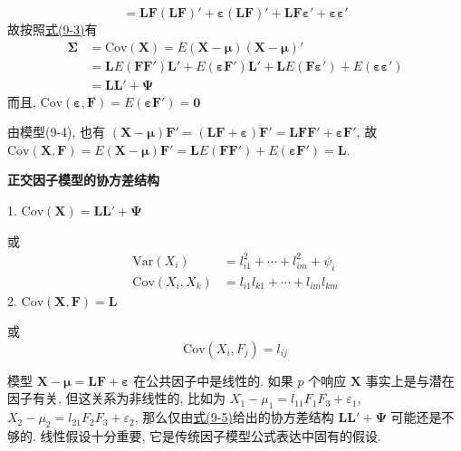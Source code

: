 
\[
=\mathbf{L}\mathbf{F}(\mathbf{L}\mathbf{F})'+\boldsymbol{\varepsilon}(\mathbf{L}\mathbf{F})'+\mathbf{L}\mathbf{F}\boldsymbol{\varepsilon}'+\boldsymbol{\varepsilon}\boldsymbol{\varepsilon}'
\]
故按照\hyperref[eq:9-3]{式(9-3)}有
\[
\begin{aligned}
\boldsymbol{\Sigma}&=\mathrm{Cov}(\mathbf{X})=E(\mathbf{X}-\boldsymbol{\mu})(\mathbf{X}-\boldsymbol{\mu})'\\
&=\mathbf{L}E(\mathbf{F}\mathbf{F}')\mathbf{L}'+E(\boldsymbol{\varepsilon}\mathbf{F}')\mathbf{L}'+\mathbf{L}E(\mathbf{F}\boldsymbol{\varepsilon}')+E(\boldsymbol{\varepsilon}\boldsymbol{\varepsilon}')\\
&=\mathbf{L}\mathbf{L}'+\boldsymbol{\Psi}
\end{aligned}
\]
而且, $\mathrm{Cov}(\boldsymbol{\varepsilon},\mathbf{F})=E(\boldsymbol{\varepsilon}\mathbf{F}')=\mathbf{0}$

由模型(9-4), 也有 $(\mathbf{X}-\boldsymbol{\mu})\mathbf{F}'=(\mathbf{L}\mathbf{F}+\boldsymbol{\varepsilon})\mathbf{F}'=\mathbf{L}\mathbf{F}\mathbf{F}'+\boldsymbol{\varepsilon}\mathbf{F}'$, 故 $\mathrm{Cov}(\mathbf{X},\mathbf{F})=E(\mathbf{X}-\boldsymbol{\mu})\mathbf{F}'=\mathbf{L}E(\mathbf{F}\mathbf{F}')+E(\boldsymbol{\varepsilon}\mathbf{F}')=\mathbf{L}$.

\begin{mvbox}
\begin{center}
\textbf{正交因子模型的协方差结构}
\end{center}
1. $\mathrm{Cov}(\mathbf{X})=\mathbf{L}\mathbf{L}'+\boldsymbol{\Psi}$

或
\label{eq:9-5}
\begin{equation}
\begin{aligned}
\mathrm{Var}(X_i)&=l_{i1}^2+\cdots+l_{im}^2+\psi_i\\
\mathrm{Cov}(X_i,X_k)&=l_{i1}l_{k1}+\cdots+l_{im}l_{km}
\end{aligned}
\tag{9-5}
\end{equation}
2. $\mathrm{Cov}(\mathbf{X},\mathbf{F})=\mathbf{L}$

或
\[
\mathrm{Cov}(X_i,F_j)=l_{ij}
\]
\end{mvbox}

模型 $\mathbf{X}-\boldsymbol{\mu}=\mathbf{L}\mathbf{F}+\boldsymbol{\varepsilon}$ 在公共因子中是线性的. 如果 $p$ 个响应 $\mathbf{X}$ 事实上是与潜在因子有关, 但这关系为非线性的, 比如为 $X_1-\mu_1=l_{11}F_1F_3+\varepsilon_1$, $X_2-\mu_2=l_{21}F_2F_3+\varepsilon_2$, 那么仅由\hyperref[eq:9-5]{式(9-5)}给出的协方差结构 $\mathbf{L}\mathbf{L}'+\boldsymbol{\Psi}$ 可能还是不够的. 线性假设十分重要, 它是传统因子模型公式表达中固有的假设.


